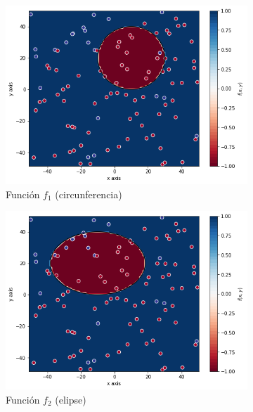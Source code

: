 \documentclass[10pt,a4paper]{article}
\begin{document}
\begin{figure}[h]
	\begin{subfigure}{0.5\textwidth}
		\centering
		\includegraphics[width=\textwidth]{ej1.2_nube_f1}
		\caption{Función $f_1$ (circunferencia)}
	\end{subfigure}
	\begin{subfigure}{0.5\textwidth}
		\centering
		\includegraphics[width=\textwidth]{ej1.2_nube_f2}
		\caption{Función $f_2$ (elipse)}
	\end{subfigure}
	\begin{subfigure}{0.5\textwidth}
		\centering

\end{subfigure}
\end{figure}
\end{document}
